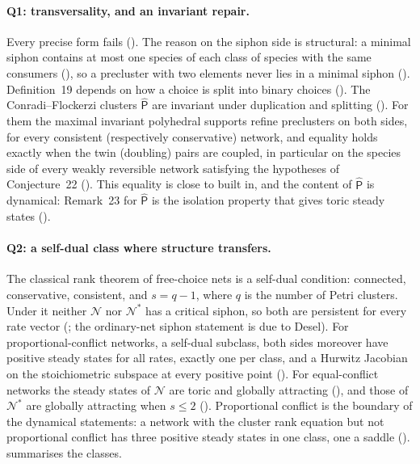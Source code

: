 \documentclass[11pt,a4paper]{report}
\newcommand{\Net}{\mathcal{N}}
\newcommand{\Nd}{\mathcal{N}^{*}}
\newcommand{\Ph}{\widehat{\mathsf{P}}}
\begin{document}
\paragraph{Q1: transversality, and an invariant repair.} Every precise form fails (). The reason
on the siphon side is structural: a minimal siphon contains at most one species of each class of species with the
same consumers (), so a precluster with two elements never lies in a minimal siphon
(). Definition~19 depends on how a choice is split into binary choices (). The
Conradi--Flockerzi clusters \(\Ph\) are invariant under duplication and splitting (). For them
the maximal invariant polyhedral supports refine preclusters on both sides, for every consistent (respectively
conservative) network, and equality holds exactly when
the twin (doubling) pairs are coupled, in particular on the species side of every weakly reversible network
satisfying the hypotheses of Conjecture~22 (). This equality is close to built in, and
the content of \(\Ph\) is dynamical: Remark~23 for \(\Ph\) is the isolation property that gives toric steady
states ().

\paragraph{Q2: a self-dual class where structure transfers.} The classical rank theorem of free-choice nets is a
self-dual condition: connected, conservative, consistent, and \(s=q-1\), where \(q\) is the number of Petri
clusters. Under it neither \(\Net\) nor \(\Nd\) has a critical siphon, so both are persistent for every rate vector
(; the ordinary-net siphon statement is due to Desel). For proportional-conflict networks, a
self-dual subclass, both sides moreover have positive steady states for all rates, exactly one per class, and a
Hurwitz Jacobian on the stoichiometric subspace at every positive point (). For equal-conflict
networks the steady states of \(\Net\) are toric and globally attracting (), and those of
\(\Nd\) are globally attracting when \(s\le2\) (). Proportional conflict is the boundary of the
dynamical statements: a network with the cluster rank equation but not proportional conflict has three positive
steady states in one class, one a saddle ().  summarises the classes.
\end{document}
